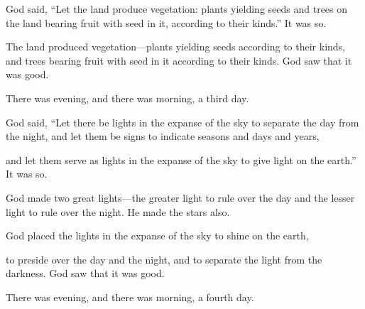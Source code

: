 \begin{scripture}
 God said, ``Let the land produce vegetation: plants yielding seeds and trees on the land bearing fruit with seed in it, according to their kinds.'' It was so.
 The land produced vegetation---plants yielding seeds according to their kinds, and trees bearing fruit with seed in it according to their kinds. God saw that it was good.
 There was evening, and there was morning, a third day.
\everypar{}

 God said, ``Let there be lights in the expanse of the sky to separate the day from the night, and let them be signs to indicate seasons and days and years,
 and let them serve as lights in the expanse of the sky to give light on the earth.'' It was so.
 God made two great lights---the greater light to rule over the day and the lesser light to rule over the night. He made the stars also.
 God placed the lights in the expanse of the sky to shine on the earth,
 to preside over the day and the night, and to separate the light from the darkness. God saw that it was good.
 There was evening, and there was morning, a fourth day.
\everypar{}


\end{scripture}
